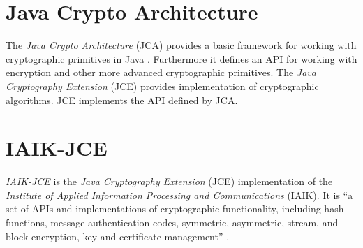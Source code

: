 


\section{Java Crypto Architecture} \label{section:pre:jca}

The \textit{Java Crypto Architecture} (JCA) provides a basic framework for working with cryptographic primitives in Java \cite{JCA}. Furthermore it defines an API for working with encryption and other more advanced cryptographic primitives.
The \textit{Java Cryptography Extension} (JCE) provides implementation of cryptographic algorithms. JCE implements the API defined by JCA. 

\section{IAIK-JCE} \label{section:pre:jce} 


\textit{IAIK-JCE} is the \textit{Java Cryptography Extension} (JCE)  implementation of the \textit{Institute of Applied Information Processing and Communications} (IAIK). It is ``a set of APIs and implementations of cryptographic functionality, including hash functions, message authentication codes, symmetric, asymmetric, stream, and block encryption, key and certificate management'' \cite{IAIKJCE}.



